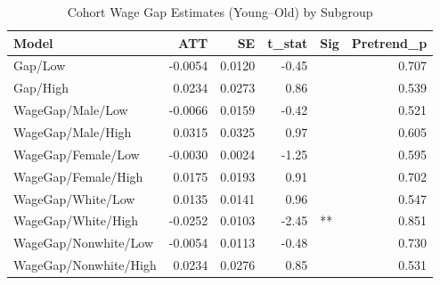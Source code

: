 \begin{table}[ht]
\centering
\begin{tabular}{lrrrlr}
  \toprule
Model & ATT & SE & t\_stat & Sig & Pretrend\_p \\ 
  \midrule
Gap/Low & -0.0054 & 0.0120 & -0.45 &  & 0.707 \\ 
  Gap/High & 0.0234 & 0.0273 & 0.86 &  & 0.539 \\ 
  WageGap/Male/Low & -0.0066 & 0.0159 & -0.42 &  & 0.521 \\ 
  WageGap/Male/High & 0.0315 & 0.0325 & 0.97 &  & 0.605 \\ 
  WageGap/Female/Low & -0.0030 & 0.0024 & -1.25 &  & 0.595 \\ 
  WageGap/Female/High & 0.0175 & 0.0193 & 0.91 &  & 0.702 \\ 
  WageGap/White/Low & 0.0135 & 0.0141 & 0.96 &  & 0.547 \\ 
  WageGap/White/High & -0.0252 & 0.0103 & -2.45 & ** & 0.851 \\ 
  WageGap/Nonwhite/Low & -0.0054 & 0.0113 & -0.48 &  & 0.730 \\ 
  WageGap/Nonwhite/High & 0.0234 & 0.0276 & 0.85 &  & 0.531 \\ 
   \bottomrule
\end{tabular}
\caption{Cohort Wage Gap Estimates (Young--Old) by Subgroup} 
\label{tab:cohort_het}
\end{table}
